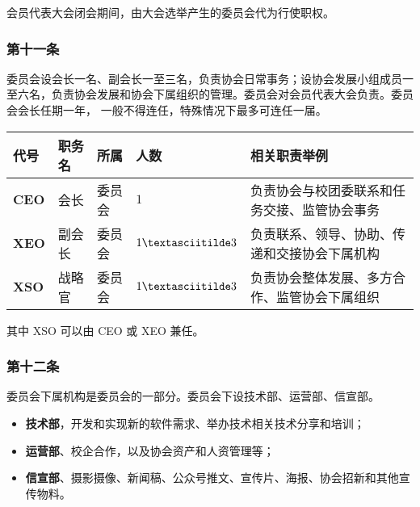 \documentclass[
]{ctexart}
\begin{document}
会员代表大会闭会期间，由大会选举产生的委员会代为行使职权。

\hypertarget{ux7b2cux5341ux4e00ux6761-ux59d4ux5458ux4f1aux7ec4ux7ec7ux7ed3ux6784}{%
\subsubsection{第十一条}\label{ux7b2cux5341ux4e00ux6761-ux59d4ux5458ux4f1aux7ec4ux7ec7ux7ed3ux6784}}

委员会设会长一名、副会长一至三名，负责协会日常事务；设协会发展小组成员一至六名，负责协会发展和协会下属组织的管理。委员会对会员代表大会负责。委员会会长任期一年，
一般不得连任，特殊情况下最多可连任一届。

{
\small
\begin{longtable}[]{@{}lllll@{}}
\toprule()
\textbf{代号} & \textbf{职务名} & \textbf{所属} & \textbf{人数} & \textbf{相关职责举例} \\
\midrule()
\endhead
\textbf{CEO} & 会长 & 委员会 & \(1\) &
负责协会与校团委联系和任务交接、监管协会事务 \\
\textbf{XEO} & 副会长 & 委员会 & \(1\textasciitilde 3\) &
负责联系、领导、协助、传递和交接协会下属机构 \\
\textbf{XSO} & 战略官 & 委员会 & \(1\textasciitilde 3\) &
负责协会整体发展、多方合作、监管协会下属组织 \\
\bottomrule()
\end{longtable}
}

其中 XSO 可以由 CEO 或 XEO 兼任。

\hypertarget{ux7b2cux5341ux4e8cux6761-ux59d4ux5458ux4f1aux4e0bux5c5eux673aux6784}{%
\subsubsection{第十二条}\label{ux7b2cux5341ux4e8cux6761-ux59d4ux5458ux4f1aux4e0bux5c5eux673aux6784}}

委员会下属机构是委员会的一部分。委员会下设技术部、运营部、信宣部。

\begin{itemize}
    \item \textbf{技术部}，开发和实现新的软件需求、举办技术相关技术分享和培训；
    \item \textbf{运营部}、校企合作，以及协会资产和人资管理等；
    \item \textbf{信宣部}、摄影摄像、新闻稿、公众号推文、宣传片、海报、协会招新和其他宣传物料。
\end{itemize}
\end{document}
